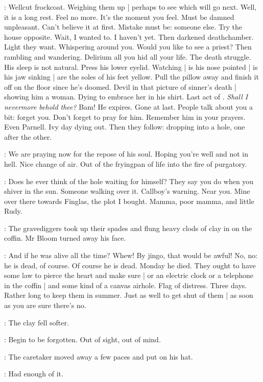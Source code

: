 \BloomInt:
Wellcut frockcoat.
Weighing them up |
perhaps to see which will go next.
Well, it is a long rest.
Feel no more.
It's the moment you feel.
Must be damned unpleasant.
Can't believe it at first.
Mistake must be:
someone else.
Try the house opposite.
Wait, I wanted to.
I haven't yet.
Then darkened deathchamber.
Light they want.
Whispering around you.
Would you like to see a priest?
Then rambling and wandering.
Delirium all you hid all your life.
The death struggle.
His sleep is not natural.
Press his lower eyelid.
Watching |
is his nose pointed |
is his jaw sinking |
are the soles of his feet yellow.
Pull the pillow away and finish it off on the floor
since he's doomed.
Devil in that picture of sinner's death |
showing him a woman.
Dying to embrace her in his shirt.
Last act of .
\emph{Shall I nevermore behold thee?}
Bam!
He expires.
Gone at last.
People talk about you a bit:
forget you.
Don't forget to pray for him.
Remember him in your prayers.
Even Parnell.
Ivy day dying out.
Then they follow:
dropping into a hole, one after the other.

\BloomInt:
We are praying now for the repose of his soul.
Hoping you're well and not in hell.
Nice change of air.
Out of the fryingpan of life into the fire of purgatory.

\BloomInt:
Does he ever think of the hole waiting for himself?
They say you do when you shiver in the sun.
Someone walking over it.
Callboy's warning.
Near you.
Mine over there towards Finglas, the plot I bought.
Mamma, poor mamma, and little Rudy.

:
The gravediggers took up their spades
and flung heavy clods of clay in on the coffin.
Mr Bloom turned away his face.

\BloomInt:
And if he was alive all the time?
Whew!
By jingo, that would be awful!
No, no:
he is dead, of course.
Of course he is dead.
Monday he died.
They ought to have some law to pierce the heart and make sure |
or an electric clock or a telephone in the coffin |
and some kind of a canvas airhole.
Flag of distress.
Three days.
Rather long to keep them in summer.
Just as well to get shut of them |
as soon as you are sure there's no.

:
The clay fell softer.

\BloomInt:
Begin to be forgotten.
Out of sight, out of mind.

:
The caretaker moved away a few paces and put on his hat.

\BloomInt:
Had enough of it.

